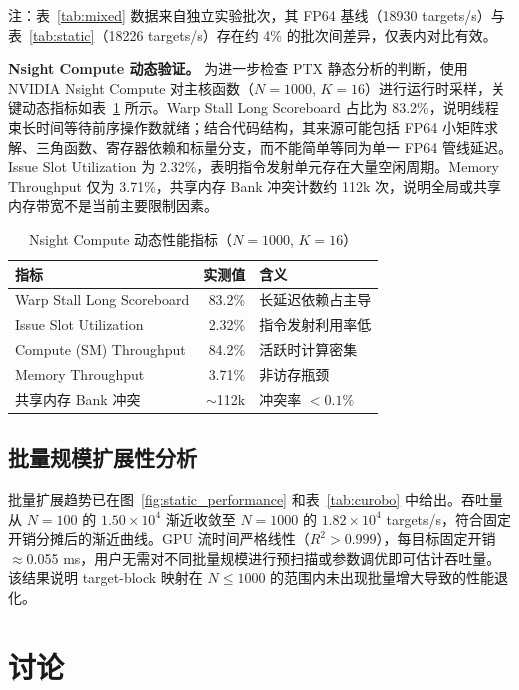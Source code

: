 \documentclass[twocolumn,a4paper,10pt]{ctexart}
\begin{document}
{\footnotesize 注：表~\ref{tab:mixed} 数据来自独立实验批次，其 FP64 基线（18930 targets/s）与表~\ref{tab:static}（18226 targets/s）存在约 4\% 的批次间差异，仅表内对比有效。}

\textbf{Nsight Compute 动态验证。} 为进一步检查 PTX 静态分析的判断，使用 NVIDIA Nsight Compute\cite{ncu} 对主核函数（$N=1000$, $K=16$）进行运行时采样，关键动态指标如表~\ref{tab:ncu} 所示。Warp Stall Long Scoreboard 占比为 83.2\%，说明线程束长时间等待前序操作数就绪；结合代码结构，其来源可能包括 FP64 小矩阵求解、三角函数、寄存器依赖和标量分支，而不能简单等同为单一 FP64 管线延迟。Issue Slot Utilization 为 2.32\%，表明指令发射单元存在大量空闲周期。Memory Throughput 仅为 3.71\%，共享内存 Bank 冲突计数约 112k 次，说明全局或共享内存带宽不是当前主要限制因素。

\begin{table}[htbp]
\centering
\caption{Nsight Compute 动态性能指标（$N{=}1000$, $K{=}16$）}
\label{tab:ncu}
\footnotesize
\begin{tabular}{lrl}
\toprule
指标 & 实测值 & 含义\\
\midrule
Warp Stall Long Scoreboard & 83.2\% & 长延迟依赖占主导\\
Issue Slot Utilization & 2.32\% & 指令发射利用率低\\
Compute (SM) Throughput & 84.2\% & 活跃时计算密集\\
Memory Throughput & 3.71\% & 非访存瓶颈\\
共享内存 Bank 冲突 & $\sim$112k & 冲突率 $<0.1\%$\\
\bottomrule
\end{tabular}
\end{table}

\subsection{批量规模扩展性分析}

批量扩展趋势已在图~\ref{fig:static_performance} 和表~\ref{tab:curobo} 中给出。吞吐量从 $N=100$ 的 $1.50\times10^4$ 渐近收敛至 $N=1000$ 的 $1.82\times10^4$ targets/s，符合固定开销分摊后的渐近曲线。GPU 流时间严格线性（$R^2>0.999$），每目标固定开销$\approx$0.055 ms，用户无需对不同批量规模进行预扫描或参数调优即可估计吞吐量。该结果说明 target-block 映射在 $N\le1000$ 的范围内未出现批量增大导致的性能退化。

\FloatBarrier
\section{讨论}
\end{document}
